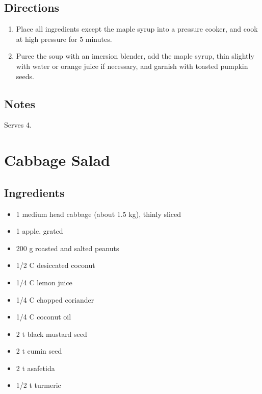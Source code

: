 \documentclass[letterpaper,10pt,english]{sphinxmanual}
\begin{document}
\section{Directions}
\label{orange_squash_soup:directions}\begin{enumerate}
\item {} 
Place all ingredients except the maple syrup into a pressure cooker, and cook at high pressure for 5 minutes.

\item {} 
Puree the soup with an imersion blender, add the maple syrup, thin slightly with water or orange juice if necessary, and garnish with toasted pumpkin seeds.

\end{enumerate}


\section{Notes}
\label{orange_squash_soup:notes}
Serves 4.


\chapter{Cabbage Salad}
\label{cabbage_salad:cabbage-salad}\label{cabbage_salad::doc}

\section{Ingredients}
\label{cabbage_salad:ingredients}\begin{itemize}
\item {} 
1       medium head cabbage (about 1.5 kg), thinly sliced

\item {} 
1       apple, grated

\item {} 
200 g   roasted and salted peanuts

\item {} 
1/2 C   desiccated coconut

\item {} 
1/4 C   lemon juice

\item {} 
1/4 C   chopped coriander

\item {} 
1/4 C   coconut oil

\item {} 
2   t   black mustard seed

\item {} 
2   t   cumin seed

\item {} 
2   t   asafetida

\item {} 
1/2 t   turmeric

\end{itemize}
\end{document}

